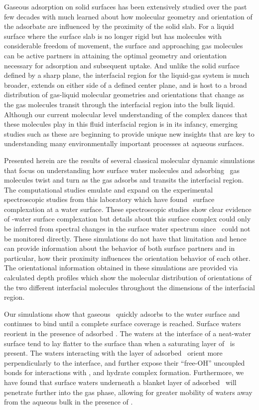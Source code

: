 \documentclass{article}
\begin{document}
Gaseous adsorption on solid surfaces has been extensively studied over the past few decades with much learned about how molecular geometry and orientation of the adsorbate are influenced by the proximity of the solid slab.  For a liquid surface where the surface slab is no longer rigid but has molecules with considerable freedom of movement, the surface and approaching gas molecules can be active partners in attaining the optimal geometry and orientation necessary for adsorption and subsequent uptake.    And unlike the solid surface defined by a sharp plane, the interfacial region for the liquid-gas system is much broader, extends on either side of a defined center plane, and is host to a broad distribution of gas-liquid molecular geometries and orientations that change as the gas molecules transit through the interfacial region into the bulk liquid.  Although  our current molecular level understanding of  the complex dances that these molecules play in this fluid interfacial region is in its infancy, emerging studies such as these are beginning to provide unique new insights that are key to understanding many  environmentally important processes at aqueous surfaces.

Presented herein are the results of several classical molecular dynamic simulations that focus on understanding how surface water molecules and adsorbing \suldiox~gas molecules twist and turn as the gas adsorbs and transits the interfacial region. The computational studies emulate and expand on the experimental spectroscopic studies from this laboratory which have found \suldiox~surface complexation at a water surface.\cite{Tarbuck2005,Tarbuck2006,Ota2011}  These spectroscopic studies show clear evidence of \suldiox-water surface complexation but details about this surface complex could only be inferred from spectral changes in the surface water spectrum since \suldiox~could not be monitored directly.   These simulations do not have that limitation and hence can provide information about the behavior of both surface partners and in particular, how their proximity influences the orientation behavior of each other.  The orientational information obtained in these simulations are provided via calculated depth profiles which show the molecular distribution of orientations of the two different interfacial molecules throughout the dimensions of the interfacial region.

Our simulations show that gaseous \suldiox~quickly adsorbs to the water surface and continues to bind until a complete surface coverage is reached. Surface waters reorient in the presence of adsorbed \suldiox. The waters at the interface of a neat-water surface tend to lay flatter to the surface than when a saturating layer of \suldiox~is present. The waters interacting with the layer of adsorbed \suldiox~orient more perpendicularly to the interface, and further expose their ``free-OH'' uncoupled bonds for interactions with \suldiox, and hydrate complex formation. Furthermore, we have found that surface waters underneath a blanket layer of adsorbed \suldiox~will penetrate further into the gas phase, allowing for greater mobility of waters away from the aqueous bulk in the presence of \suldiox.
\end{document}
